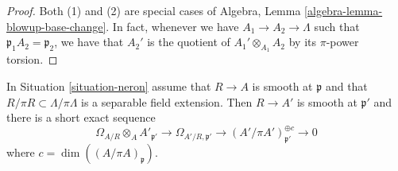 \begin{proof}
Both (1) and (2) are special cases of
Algebra, Lemma \ref{algebra-lemma-blowup-base-change}.
In fact, whenever we have $A_1 \to A_2 \to \Lambda$ such that
$\mathfrak p_1 A_2 = \mathfrak p_2$, we have that $A_2'$ is
the quotient of $A_1' \otimes_{A_1} A_2$ by its $\pi$-power torsion.
\end{proof}

\begin{lemma}
\label{lemma-neron-blowup-smooth}
In Situation \ref{situation-neron} assume that $R \to A$ is smooth
at $\mathfrak p$ and that $R/\pi R \subset \Lambda/\pi \Lambda$
is a separable field extension. Then $R \to A'$ is smooth at
$\mathfrak p'$ and there is a short exact sequence
$$
\Omega_{A/R} \otimes_A A'_{\mathfrak p'} \to
\Omega_{A'/R, \mathfrak p'} \to
(A'/\pi A')_{\mathfrak p'}^{\oplus c} \to 0
$$
where $c = \dim((A/\pi A)_\mathfrak p)$.
\end{lemma}


